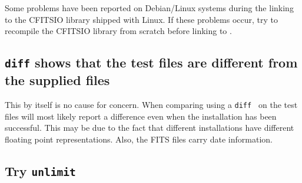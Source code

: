 \documentclass[12pt,twoside]{article}
\begin{document}
Some problems have been reported on Debian/Linux systems during the
linking to the CFITSIO library shipped with Linux. If these problems
occur, try to recompile the CFITSIO library from scratch before linking
to \healpix.






\subsection{{\tt diff} shows that the test files are different from
the supplied files}

This by itself is no cause for concern. When comparing using a
{\tt diff } on the test files will most likely report a
difference even when the installation has been successful. 
This  may be due to the fact that
different installations  have different floating point
representations. Also, the FITS files carry date information.



\subsection{Try {\tt unlimit}}
\end{document}
